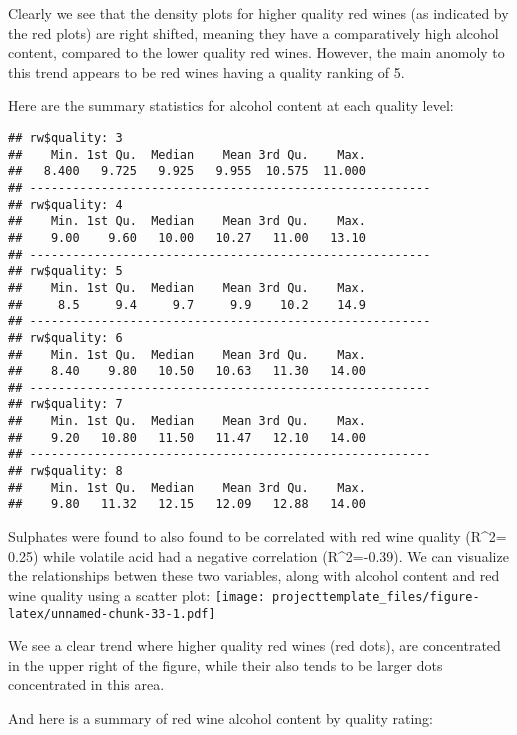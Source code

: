 \documentclass[]{article}
\begin{document}
Clearly we see that the density plots for higher quality red wines (as
indicated by the red plots) are right shifted, meaning they have a
comparatively high alcohol content, compared to the lower quality red
wines. However, the main anomoly to this trend appears to be red wines
having a quality ranking of 5.

Here are the summary statistics for alcohol content at each quality
level:

\begin{verbatim}
## rw$quality: 3
##    Min. 1st Qu.  Median    Mean 3rd Qu.    Max. 
##   8.400   9.725   9.925   9.955  10.575  11.000 
## -------------------------------------------------------- 
## rw$quality: 4
##    Min. 1st Qu.  Median    Mean 3rd Qu.    Max. 
##    9.00    9.60   10.00   10.27   11.00   13.10 
## -------------------------------------------------------- 
## rw$quality: 5
##    Min. 1st Qu.  Median    Mean 3rd Qu.    Max. 
##     8.5     9.4     9.7     9.9    10.2    14.9 
## -------------------------------------------------------- 
## rw$quality: 6
##    Min. 1st Qu.  Median    Mean 3rd Qu.    Max. 
##    8.40    9.80   10.50   10.63   11.30   14.00 
## -------------------------------------------------------- 
## rw$quality: 7
##    Min. 1st Qu.  Median    Mean 3rd Qu.    Max. 
##    9.20   10.80   11.50   11.47   12.10   14.00 
## -------------------------------------------------------- 
## rw$quality: 8
##    Min. 1st Qu.  Median    Mean 3rd Qu.    Max. 
##    9.80   11.32   12.15   12.09   12.88   14.00
\end{verbatim}

Sulphates were found to also found to be correlated with red wine
quality (R\^{}2= 0.25) while volatile acid had a negative correlation
(R\^{}2=-0.39). We can visualize the relationships betwen these two
variables, along with alcohol content and red wine quality using a
scatter plot:
\texttt{[image: projecttemplate\_files/figure-latex/unnamed-chunk-33-1.pdf]}

We see a clear trend where higher quality red wines (red dots), are
concentrated in the upper right of the figure, while their also tends to
be larger dots concentrated in this area.

And here is a summary of red wine alcohol content by quality rating:
\end{document}
